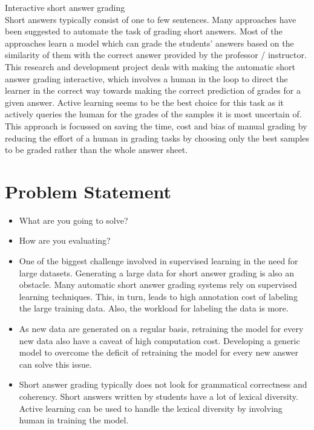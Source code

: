 \documentclass[rnd]{mas_proposal}
\begin{document}
\begin{itemize}
\begin{itemize}
     \end{itemize}
    
Interactive short answer grading \\

Short answers typically consist of one to few sentences. Many approaches have been suggested to automate the task of grading short answers. Most of the approaches learn a model which can grade the students' answers based on the similarity of them with the correct answer provided by the professor / instructor. This research and development project deals with making the automatic short answer grading interactive, which involves a human in the loop to direct the learner in the correct way towards making the correct prediction of grades for a given answer. Active learning seems to be the best choice for this task as it actively queries the human for the grades of the samples it is most uncertain of. This approach is focussed on saving the time, cost and bias of manual grading by reducing the effort of a human in grading tasks by choosing only the best samples to be graded rather than the whole answer sheet. 

\end{itemize}





\section{Problem Statement}
\begin{itemize}
    \item What are you going to solve?
    \item How are you evaluating?
    
    \item One of the biggest challenge involved in supervised learning in the need for large datasets. Generating a large data for short answer grading is also an obstacle. Many automatic short answer grading systems rely on supervised learning techniques. This, in turn, leads to high annotation cost of labeling the large training data. Also, the workload for labeling the data is more.
    \item As new data are generated on a regular basis, retraining the model for every new data also have a caveat of high computation cost.  Developing a generic model to overcome the deficit of retraining the model for every new answer can solve this issue.
    \item Short answer grading typically does not look for grammatical correctness and coherency. Short answers written by students have a lot of lexical diversity. Active learning can be used to handle the lexical diversity by involving human in training the model.
\end{itemize}
\end{document}
